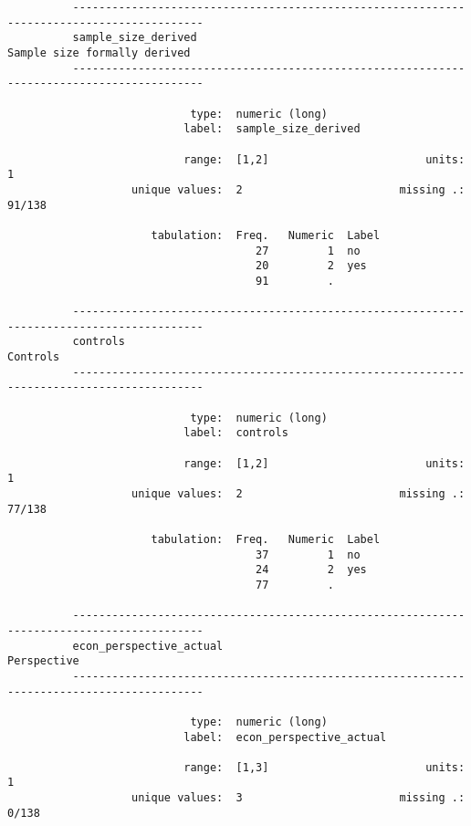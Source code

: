 \documentclass{article}
\begin{document}
\begin{verbatim}
          ------------------------------------------------------------------------------------------
          sample_size_derived                                           Sample size formally derived
          ------------------------------------------------------------------------------------------
          
                            type:  numeric (long)
                           label:  sample_size_derived
          
                           range:  [1,2]                        units:  1
                   unique values:  2                        missing .:  91/138
          
                      tabulation:  Freq.   Numeric  Label
                                      27         1  no
                                      20         2  yes
                                      91         .  
          
          ------------------------------------------------------------------------------------------
          controls                                                                          Controls
          ------------------------------------------------------------------------------------------
          
                            type:  numeric (long)
                           label:  controls
          
                           range:  [1,2]                        units:  1
                   unique values:  2                        missing .:  77/138
          
                      tabulation:  Freq.   Numeric  Label
                                      37         1  no
                                      24         2  yes
                                      77         .  
          
          ------------------------------------------------------------------------------------------
          econ_perspective_actual                                                        Perspective
          ------------------------------------------------------------------------------------------
          
                            type:  numeric (long)
                           label:  econ_perspective_actual
          
                           range:  [1,3]                        units:  1
                   unique values:  3                        missing .:  0/138
          

\end{verbatim}
\end{document}
